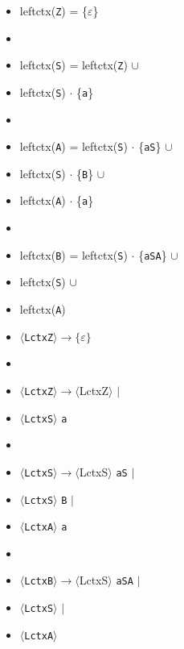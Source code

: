 \setlist{}
\newpage
{}
\begin{multicols}{2}
    \begin{itemize}
        \item leftctx(\texttt{Z}) = \{$\varepsilon$\}
        \item[]
        \item leftctx(\texttt{S}) = leftctx(\texttt{Z}) $\cup$
        \item \makebox[2.16cm]{}    leftctx(\texttt{S}) $\cdot$ \{\texttt{a}\}
        \item[]
        \item leftctx(\texttt{A}) = leftctx(\texttt{S}) $\cdot$ \{\texttt{aS}\} $\cup$
        \item \makebox[2.16cm]{}    leftctx(\texttt{S}) $\cdot$ \{\texttt{B}\} $\cup$
        \item \makebox[2.16cm]{}    leftctx(\texttt{A}) $\cdot$ \{\texttt{a}\}
        \item[]
        \item leftctx(\texttt{B}) = leftctx(\texttt{S}) $\cdot$ \{\texttt{aSA}\} $\cup$
        \item \makebox[2.16cm]{}    leftctx(\texttt{S}) $\cup$
        \item \makebox[2.16cm]{}    leftctx(\texttt{A})
    \end{itemize}
    \columnbreak
    \begin{itemize}
        \item[] $\langle$\texttt{LctxZ}$\rangle \rightarrow \{\varepsilon\}$
        \item[]
        \item[] $\langle$\texttt{LctxZ}$\rangle \rightarrow \langle$LctxZ$\rangle$ $|$
        \item[] \makebox[1.97cm]{}    $\langle$\texttt{LctxS}$\rangle$ \texttt{a}
        \item[]
        \item[] $\langle$\texttt{LctxS}$\rangle \rightarrow \langle$LctxS$\rangle$ \texttt{aS} $|$
        \item[] \makebox[1.97cm]{}    $\langle$\texttt{LctxS}$\rangle$ \texttt{B} $|$
        \item[] \makebox[1.97cm]{}    $\langle$\texttt{LctxA}$\rangle$ \texttt{a}
        \item[]
        \item[] $\langle$\texttt{LctxB}$\rangle \rightarrow \langle$LctxS$\rangle$ \texttt{aSA} $|$
        \item[] \makebox[1.97cm]{}    $\langle$\texttt{LctxS}$\rangle$ $|$
        \item[] \makebox[1.97cm]{}    $\langle$\texttt{LctxA}$\rangle$
    \end{itemize}
\end{multicols}
\setlist{}


